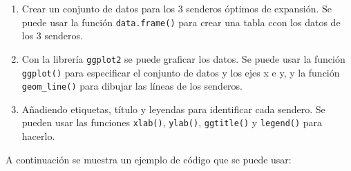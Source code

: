 \documentclass[
  spanish,
  12pt,
]{book}
\providecommand{\tightlist}{%
  \setlength{\itemsep}{0pt}\setlength{\parskip}{0pt}}
\begin{document}
\begin{enumerate}
\def\labelenumi{\arabic{enumi}.}
\tightlist
\item
  Crear un conjunto de datos para los 3 senderos óptimos de expansión.
  Se puede usar la función \texttt{data.frame()} para crear una tabla
  ccon los datos de los 3 senderos.
\item
  Con la librería \texttt{ggplot2} se puede graficar los datos. Se puede
  usar la función \texttt{ggplot()} para especificar el conjunto de
  datos y los ejes x e y, y la función \texttt{geom\_line()} para
  dibujar las líneas de los senderos.
\item
  Añadiendo etiquetas, título y leyendas para identificar cada sendero.
  Se pueden usar las funciones \texttt{xlab()}, \texttt{ylab()},
  \texttt{ggtitle()} y \texttt{legend()} para hacerlo.
\end{enumerate}

A continuación se muestra un ejemplo de código que se puede usar:
\end{document}
